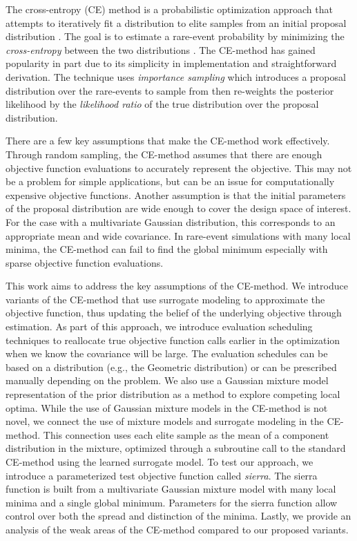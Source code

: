 The cross-entropy (CE) method is a probabilistic optimization approach that attempts to iteratively fit a distribution to elite samples from an initial proposal distribution \cite{rubinstein2004cross,rubinstein1999cross}.
The goal is to estimate a rare-event probability by minimizing the \textit{cross-entropy} between the two distributions \cite{de2005tutorial}.
The CE-method has gained popularity in part due to its simplicity in implementation and straightforward derivation.
The technique uses \textit{importance sampling} which introduces a proposal distribution over the rare-events to sample from then re-weights the posterior likelihood by the \textit{likelihood ratio} of the true distribution over the proposal distribution.

There are a few key assumptions that make the CE-method work effectively.
Through random sampling, the CE-method assumes that there are enough objective function evaluations to accurately represent the objective. 
This may not be a problem for simple applications, but can be an issue for computationally expensive objective functions. 
Another assumption is that the initial parameters of the proposal distribution are wide enough to cover the design space of interest. For the case with a multivariate Gaussian distribution, this corresponds to an appropriate mean and wide covariance.
In rare-event simulations with many local minima, the CE-method can fail to find the global minimum especially with sparse objective function evaluations.

This work aims to address the key assumptions of the CE-method.
We introduce variants of the CE-method that use surrogate modeling to approximate the objective function, thus updating the belief of the underlying objective through estimation.
As part of this approach, we introduce evaluation scheduling techniques to reallocate true objective function calls earlier in the optimization when we know the covariance will be large.
The evaluation schedules can be based on a distribution (e.g., the Geometric distribution) or can be prescribed manually depending on the problem.
We also use a Gaussian mixture model representation of the prior distribution as a method to explore competing local optima.
While the use of Gaussian mixture models in the CE-method is not novel, we connect the use of mixture models and surrogate modeling in the CE-method.
This connection uses each elite sample as the mean of a component distribution in the mixture, optimized through a subroutine call to the standard CE-method using the learned surrogate model.
To test our approach, we introduce a parameterized test objective function called \textit{sierra}.
The sierra function is built from a multivariate Gaussian mixture model with many local minima and a single global minimum.
Parameters for the sierra function allow control over both the spread and distinction of the minima.
Lastly, we provide an analysis of the weak areas of the CE-method compared to our proposed variants.


